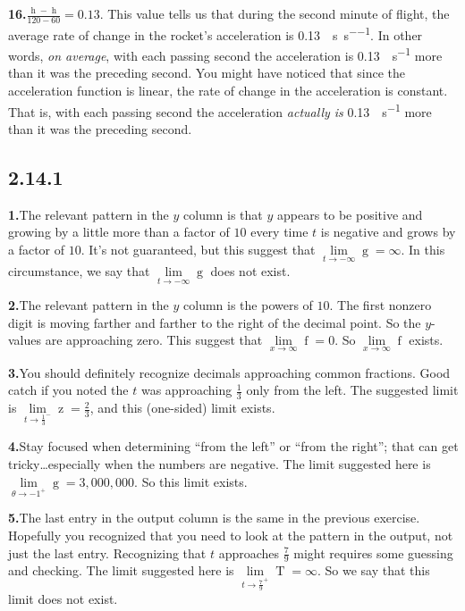 \documentclass[12pt,]{book}
\theoremstyle{plain}
\theoremstyle{definition}
\numberwithin{equation}{section}
\newcommand{\fe}[2]{\mathop{{#1}{\left(#2\right)}}}
\begin{document}
\par\smallskip
\noindent\textbf{16.}\quad{}\(\frac{\fe{h}{120}-\fe{h}{60}}{120-60}=0.13\). This value tells us that during the second minute of flight, the average rate of change in the rocket's acceleration is \SI{0.13}{\mileperhour\per\second\per\second}.  In other words, \emph{on average}, with each passing second the acceleration  is \SI{0.13}{\mileperhour\per\second} more than it was the preceding second.  You might have noticed that since the acceleration function is linear, the rate of change in the acceleration is constant.  That is, with each passing second the acceleration \emph{actually is} \SI{0.13}{\mileperhour\per\second} more than it was the preceding second.%
\par\smallskip
\subsection*{2.14.1 }
\noindent\textbf{1.}\quad{}The relevant pattern in the \(y\) column is that \(y\) appears to be positive and growing by a little more than a factor of \(10\) every time \(t\) is negative and grows by a factor of \(10\). It's not guaranteed, but this suggest that \(\lim\limits_{t\to-\infty}\fe{g}{t}=\infty\). In this circumstance, we say that \(\lim\limits_{t\to-\infty}\fe{g}{t}\) does not exist.%
\par\smallskip
\noindent\textbf{2.}\quad{}The relevant pattern in the \(y\) column is the powers of \(10\).  The first nonzero digit is moving farther and farther to the right of the decimal point. So the \(y\)-values are approaching zero. This suggest that \(\lim\limits_{x\to\infty}\fe{f}{x}=0\). So \(\lim\limits_{x\to\infty}\fe{f}{x}\) exists.%
\par\smallskip
\noindent\textbf{3.}\quad{}You should definitely recognize decimals approaching common fractions.  Good catch if you noted the \(t\) was approaching \(\frac{1}{3}\) only from the left. The suggested limit is \(\lim\limits_{t\to\frac{1}{3}^{-}}\fe{z}{t}=\frac{2}{3}\), and this (one-sided) limit exists.%
\par\smallskip
\noindent\textbf{4.}\quad{}Stay focused when determining ``from the left'' or ``from the right''; that can get tricky\dots{}especially when the numbers are negative.  The limit suggested here is \(\lim\limits_{\theta\to-1^{+}}\fe{g}{\theta}=3{,}000{,}000\). So this limit exists.%
\par\smallskip
\noindent\textbf{5.}\quad{}The last entry in the output column is the same in the previous exercise.  Hopefully you recognized that you need to look at the pattern in the output, not just the last entry.  Recognizing that \(t\) approaches \(\frac{7}{9}\) might requires some guessing and checking. The limit suggested here is \(\lim\limits_{t\to\frac{7}{9}^{+}}\fe{T}{t}=\infty\). So we say that this limit does not exist.%
\end{document}
